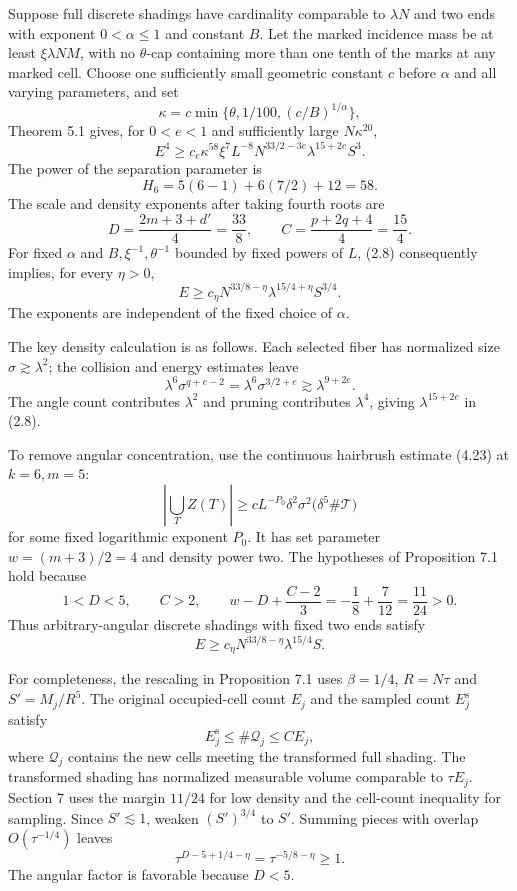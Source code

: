 \documentclass[
  11pt,
  a4paper,
]{article}
\begin{document}
Suppose full discrete shadings have cardinality comparable to
\(\lambda N\) and two ends with exponent \(0<\alpha\le1\) and constant
\(B\). Let the marked incidence mass be at least \(\xi\lambda NM\), with
no \(\theta\)-cap containing more than one tenth of the marks at any
marked cell. Choose one sufficiently small geometric constant \(c\)
before \(\alpha\) and all varying parameters, and set \[
 \kappa=c\min\{\theta,1/100,(c/B)^{1/\alpha}\},
\] Theorem 5.1 gives, for \(0<e<1\) and sufficiently large
\(N\kappa^{20}\), \[
 E^4\ge c_e\kappa^{58}\xi^7L^{-8}
       N^{33/2-3e}\lambda^{15+2e}S^3.
 \tag{2.8}\label{eq:2.8}
\] The power of the separation parameter is \[
 H_6=5(6-1)+6(7/2)+12=58.
\] The scale and density exponents after taking fourth roots are \[
 D=\frac{2m+3+d'}4=\frac{33}{8},
 \qquad C=\frac{p+2q+4}4=\frac{15}{4}.
 \tag{2.9}\label{eq:2.9}
\] For fixed \(\alpha\) and \(B,\xi^{-1},\theta^{-1}\) bounded by fixed
powers of \(L\), (2.8) consequently implies, for every \(\eta>0\), \[
 E\ge c_\eta N^{33/8-\eta}
       \lambda^{15/4+\eta}S^{3/4}.
 \tag{2.10}\label{eq:2.10}
\] The exponents are independent of the fixed choice of \(\alpha\).

The key density calculation is as follows. Each selected fiber has
normalized size \(\sigma\gtrsim\lambda^2\); the collision and energy
estimates leave \[
 \lambda^6\sigma^{q+e-2}
 =\lambda^6\sigma^{3/2+e}
 \gtrsim\lambda^{9+2e}.
\] The angle count contributes \(\lambda^2\) and pruning contributes
\(\lambda^4\), giving \(\lambda^{15+2e}\) in (2.8).

To remove angular concentration, use the continuous hairbrush estimate
(4.23) at \(k=6,m=5\): \[
 \left|\bigcup_T Z(T)\right|
 \ge cL^{-P_0}\delta^2\sigma^2
       \bigl(\delta^5\#\mathcal T\bigr)
\] for some fixed logarithmic exponent \(P_0\). It has set parameter
\(w=(m+3)/2=4\) and density power two. The hypotheses of Proposition 7.1
hold because \[
 1<D<5,\qquad C>2,\qquad
 w-D+\frac{C-2}{3}
 =-\frac18+\frac{7}{12}=\frac{11}{24}>0.
 \tag{2.11}\label{eq:2.11}
\] Thus arbitrary-angular discrete shadings with fixed two ends satisfy
\[
 E\ge c_\eta N^{33/8-\eta}\lambda^{15/4}S.
 \tag{2.12}\label{eq:2.12}
\]

For completeness, the rescaling in Proposition 7.1 uses \(\beta=1/4\),
\(R=N\tau\) and \(S'=M_j/R^5\). The original occupied-cell count \(E_j\)
and the sampled count \(E_j^{\mathrm s}\) satisfy \[
 E_j^{\mathrm s}\le\#\mathcal Q_j\le CE_j,
\] where \(\mathcal Q_j\) contains the new cells meeting the transformed
full shading. The transformed shading has normalized measurable volume
comparable to \(\tau E_j\). Section 7 uses the margin \(11/24\) for low
density and the cell-count inequality for sampling. Since
\(S'\lesssim1\), weaken \((S')^{3/4}\) to \(S'\). Summing pieces with
overlap \(O(\tau^{-1/4})\) leaves \[
 \tau^{D-5+1/4-\eta}=\tau^{-5/8-\eta}\ge1.
 \tag{2.13}\label{eq:2.13}
\] The angular factor is favorable because \(D<5\).
\end{document}
